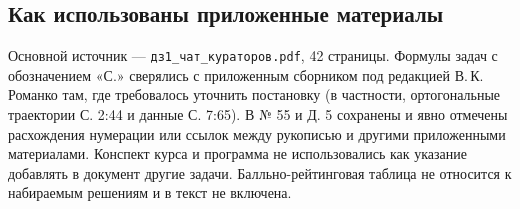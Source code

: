 \subsection*{Как использованы приложенные материалы}
Основной источник --- \texttt{дз1\_чат\_кураторов.pdf}, 42 страницы.
Формулы задач с обозначением «С.» сверялись с приложенным сборником
под редакцией В.\,К.\,Романко там, где требовалось уточнить постановку
(в частности, ортогональные траектории С. 2:44 и данные С. 7:65).
В № 55 и Д. 5 сохранены и явно отмечены расхождения нумерации или
ссылок между рукописью и другими приложенными материалами.
Конспект курса и программа не использовались как указание добавлять
в документ другие задачи. Балльно-рейтинговая таблица не относится
к набираемым решениям и в текст не включена.
